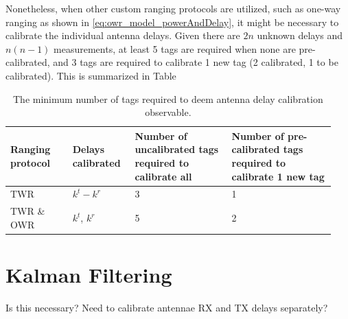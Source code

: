 \documentclass{decar-wsd}    %
\begin{document}
Nonetheless, when other custom ranging protocols are utilized, such as one-way ranging as shown in \eqref{eq:owr_model_powerAndDelay}, it might be necessary to calibrate the individual antenna delays. Given there are $2n$ unknown delays and $n(n-1)$ measurements, at least 5 tags are required when none are pre-calibrated, and 3 tags are required to calibrate 1 new tag (2 calibrated, 1 to be calibrated). This is summarized in Table

\begin{table}[h!]
    \begin{center}
      \caption{The minimum number of tags required to deem antenna delay calibration observable.}
      \label{tab:delays}
      \begin{tabular}{p{0.18\linewidth}|p{0.18\linewidth}|p{0.28\linewidth}|p{0.3\linewidth}}
        \textbf{Ranging protocol} & \textbf{Delays calibrated} & \textbf{Number of uncalibrated tags required to calibrate all} & \textbf{Number of pre-calibrated tags required to calibrate 1 new tag}\\
        \hline
        TWR & $k^t - k^r$ & 3 & 1\\
        TWR \& OWR & $k^t$, $k^r$ & 5 & 2\\
      \end{tabular}
    \end{center}
  \end{table}



\clearpage
\section{Kalman Filtering}

Is this necessary? Need to calibrate antennae RX and TX delays separately?

\clearpage


% 
% 
%  

\end{document}
